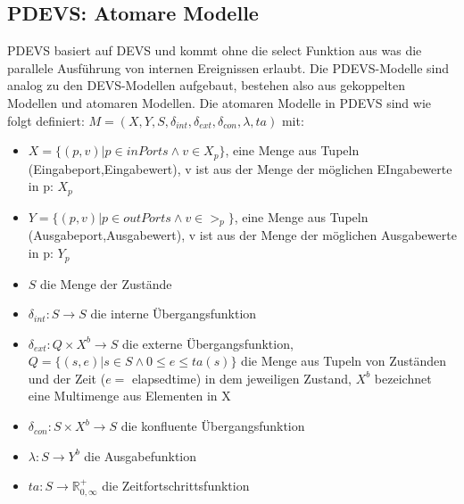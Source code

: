 \documentclass[11pt, fleqn, a4paper, leqno]{scrartcl} %
\begin{document}
	\subsection{PDEVS: Atomare Modelle}
	PDEVS basiert auf DEVS und kommt ohne die select Funktion aus was die parallele Ausführung von internen Ereignissen erlaubt. Die PDEVS-Modelle sind analog zu den DEVS-Modellen aufgebaut, bestehen also aus gekoppelten Modellen und atomaren Modellen. Die atomaren Modelle in PDEVS sind wie folgt definiert: $M=(X,Y,S,\delta_{int},\delta_{ext},\delta_{con},\lambda,ta)$ mit:
	\begin{itemize}
		\item $X = \{(p,v)|p \in inPorts \wedge v \in X_{p}\}$, eine Menge aus Tupeln (Eingabeport,Eingabewert), v ist aus der Menge der möglichen EIngabewerte in p: $X_{p}$
		\item $Y = \{(p,v)|p \in outPorts \wedge v \in >_{p}\}$, eine Menge aus Tupeln (Ausgabeport,Ausgabewert), v ist aus der Menge der möglichen Ausgabewerte in p: $Y_{p}$
		\item $S$ die Menge der Zustände
		\item $\delta_{int}: S \rightarrow S$ die interne Übergangsfunktion
		\item $\delta_{ext}: Q \times X^{b}  \rightarrow S$ die externe Übergangsfunktion, $Q=\{(s,e)|s \in S \wedge 0 \leq e \le ta(s)\}$ die Menge aus Tupeln von Zuständen und der Zeit ($e = $ elapsedtime) in dem jeweiligen Zustand, $X^{b}$ bezeichnet eine Multimenge aus Elementen in X
		\item $\delta_{con}: S \times X^{b} \rightarrow S$ die konfluente Übergangsfunktion
		\item $\lambda: S \rightarrow Y^{b}$ die Ausgabefunktion
		\item $ta: S \rightarrow \mathds{R}^{+}_{0,\infty}$ die Zeitfortschrittsfunktion
	\end{itemize}
\end{document}
